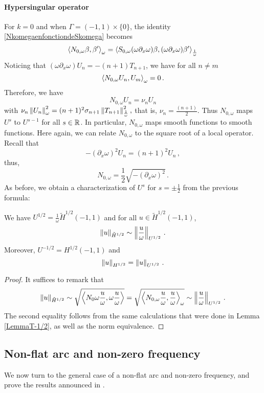 \documentclass[a4paper]{article}
\begin{document}
\paragraph{Hypersingular operator}For $k = 0$ and when $\Gamma = (-1,1)\times \{0\}$, the identity \eqref{NkomegaenfonctiondeSkomega} becomes
\[\left\langle N_{0,\omega} \beta,\beta'\right\rangle_\omega = \left\langle S_{0,\omega}  (\omega \partial_x \omega) \beta, (\omega \partial_x \omega) \beta'\right\rangle_\frac{1}{\omega}\] 
Noticing that $(\omega \partial_x \omega) U_n = -(n+1) T_{n+1}$, we have for all $n \neq m$ 
\[\left\langle N_{0,\omega }U_n,U_m\right\rangle_\omega = 0 \,.\]
Therefore, we have 
\[N_{0,\omega} U_n = \nu_n U_n\] 
with 
$\nu_n\left\|U_n\right\|_{\omega}^2 = (n+1)^2 \sigma_{n+1} \left\|T_{n+1}\right\|_\frac{1}{\omega}^2,$
that is, $\nu_n = \frac{(n+1)}{2}$.
Thus $N_{0,\omega}$ maps $U^s$ to $U^{s-1}$ for all $s \in \mathbb{R}$. In particular, $N_{0,\omega}$ maps smooth functions to smooth functions. 
Here again, we can relate $N_{0,\omega}$ to the square root of a local operator. Recall that
\[-(\partial_x \omega)^2 U_n = (n+1)^2 U_n\,,\]
thus,
\begin{equation}
\label{prelude2}
	N_{0,\omega} = \frac{1}{2}\sqrt{-(\partial_x \omega)^2}\,.
\end{equation}
As before, we obtain a characterization of $U^{s}$ for $s = \pm \frac{1}{2}$ from the previous formula:
\begin{Lem} 
\label{LemU12}	
We have $U^{1/2} =  \frac{1}{\omega} \tilde{H}^{1/2}(-1,1)$ and for all $u\in \tilde{H}^{1/2}(-1,1)$,
\[\left\|u\right\|_{\tilde{H}^{1/2}} \sim \left\|\frac{u}{\omega}\right\|_{U^{1/2}}\,.\]
Moreover, $U^{-1/2} = H^{1/2}(-1,1)$ and 
\[\left\|u\right\|_{H^{1/2}} = \left\|u\right\|_{U^{1/2}}\,.\]
\end{Lem}
\begin{proof} It suffices to remark that 
	\[ \left\|u\right\|_{\tilde{H}^{1/2}} \sim \sqrt{\left\langle N_0\omega \frac{u}{\omega},\omega \frac{u}{\omega}\right\rangle} = \sqrt{\left\langle N_{0,\omega} \frac{u}{\omega},\frac{u}{\omega}\right\rangle_\omega} \sim \left\|\frac{u}{\omega}\right\|_{U^{1/2}}\,.\]
	The second equality follows from the same calculations that were done in Lemma \ref{LemmaT-1/2}, as well as the norm equivalence. 
\end{proof}

\subsection{Non-flat arc and non-zero frequency}

We now turn to the general case of a non-flat arc and non-zero frequency, and prove the results announced in \cite{alouges2018new}.
\end{document}
